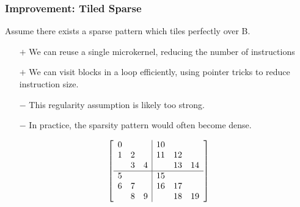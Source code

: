 \documentclass[9pt]{beamer}
\begin{document}
\begin{frame}[fragile]
  \frametitle{Improvement: Tiled Sparse}
        Assume there exists a sparse pattern which tiles perfectly over B.
        \begin{itemize}
        \item[$+$] We can reuse a single microkernel, reducing the number of instructions
        \item[$+$] We can visit blocks in a loop efficiently, using pointer tricks to reduce instruction size.
        \item[$-$] This regularity assumption is likely too strong.
        \item[$-$] In practice, the sparsity pattern would often become dense.
        \end{itemize}


      \[
      \left[
          \begin{array}{c c c | c c c }
          0 &   &   & 10 &   &   \\
          1 & 2 &   & 11& 12&   \\
            & 3 & 4 &   & 13& 14  \\
          \hline
          5 &   &   & 15  &   &   \\
          6 & 7 &   & 16  &17   &   \\
            & 8 & 9 &   & 18  &19   \\
          \end{array}
          \right]
      \]
\end{frame}
\end{document}
